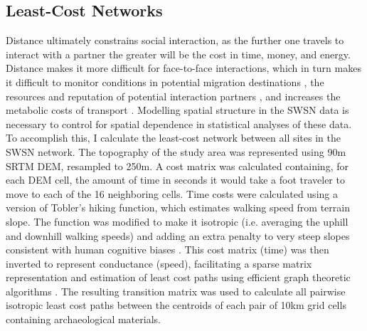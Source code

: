 \documentclass[11pt]{iopart}
\begin{document}
\subsection*{Least-Cost Networks}
Distance ultimately constrains social interaction, as the further one travels to interact with a partner the greater will be the cost in time, money, and energy. Distance makes it more difficult for face-to-face interactions, which in turn makes it difficult to monitor conditions in potential migration destinations \parencite{Anderies2011a}, the resources and reputation of potential interaction partners \parencite{Fafchamps2007}, and increases the metabolic costs of transport \parencite{Drennan1984}. Modelling spatial structure in the SWSN data is necessary to control for spatial dependence in statistical analyses of these data. To accomplish this, I calculate the least-cost network between all sites in the SWSN network. The topography of the study area was represented using 90m SRTM DEM, resampled to 250m. A cost matrix was calculated containing, for each DEM cell, the amount of time in seconds it would take a foot traveler to move to each of the 16 neighboring cells. Time costs were calculated using a version of Tobler's hiking function, which estimates walking speed from terrain slope. The function was modified to make it isotropic (i.e. averaging the uphill and downhill walking speeds) and adding an extra penalty to very steep slopes consistent with human cognitive biases \parencite{Pingel2010}. This cost matrix (time) was then inverted to represent conductance (speed), facilitating a sparse matrix representation and estimation of least cost paths using efficient graph theoretic algorithms \parencite{Etten2014}. The resulting transition matrix was used to calculate all pairwise isotropic least cost paths between the centroids of each pair of 10km grid cells containing archaeological materials. 
\end{document}
